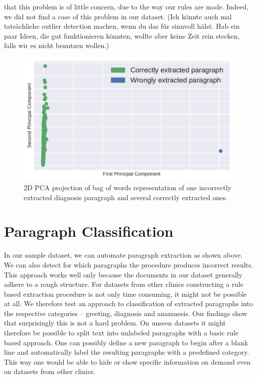 that this problem is of little concern, due to the way our rules are made.
Indeed, we did not find a case
of this problem in our dataset. (Ich könnte auch mal tatsächliche outlier detection machen, wenn du das für sinnvoll hälst. Hab ein paar Ideen, die gut funktionieren könnten, wollte aber keine Zeit rein stecken, falls wir es nicht benutzen wollen.)
\begin{figure}
	\includegraphics[width=\linewidth]{figures/bow_find_odd}
	\caption{2D PCA projection of bag of words representation of one incorrectly extracted diagnosis paragraph and several correctly extracted ones.}
	\label{fig:bow_find_odd}
\end{figure}




\section{Paragraph Classification}
In our sample dataset, we can automate paragraph extraction as shown above. We can also detect for which paragraphs the procedure produces incorrect results. This approach works well only because the documents in our dataset generally adhere to a rough structure. For datasets from other clinics constructing a rule based extraction procedure is not only time consuming, it might not be possible at all. We therefore test an approach to classification of extracted paragraphs into the respective categories --  greeting, diagnosis and anamnesis. Our findings show that surprisingly this is not a hard problem. On unseen datasets it might therefore be possible to split text into unlabeled paragraphs with a basic rule based approach. One can possibly define a new paragraph to begin after a blank line and automatically label the resulting paragraphs with a predefined category. This way one would be able to hide or show specific information on demand even on datasets from other clinics.

